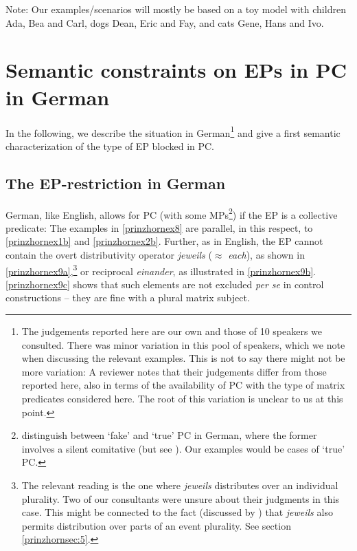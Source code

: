 \documentclass[output=paper,colorlinks,citecolor=brown,
]{langscibook}
\begin{document}
Note: Our examples/scenarios will mostly be based on a toy model with children Ada, Bea and Carl, dogs Dean, Eric and Fay, and cats Gene, Hans and Ivo. 



\section{Semantic constraints on EPs in PC in German}\label{prinzhornsec:2}

In the following, we describe the situation in German\footnote{The judgements reported here are our own and those of 10 speakers we consulted. There was minor variation in this pool of speakers, which we note when discussing the relevant examples. This is not to say there might not be more variation: A reviewer notes that their judgements differ from those reported here, also in terms of the availability of PC with the type of matrix predicates considered here. The root of this variation is unclear to us at this point.} and give a first semantic characterization of the type of EP blocked in PC.

\subsection{The EP-restriction in German}\label{prinzhornsec:2.1}

German, like English, allows for PC (with some MPs\footnote{\cite{Pitteroff:2017} distinguish between `fake' and `true' PC in German, where the former involves a silent comitative (but see \citealt{Landau:2016}). Our examples would be cases of `true' PC.}) if the EP is a collective predicate: The examples in \ref{prinzhornex8} are parallel, in this respect, to \ref{prinzhornex1b} and  \ref{prinzhornex2b}. Further, as in English, the EP cannot contain the overt distributivity operator \textit{jeweils} ($\approx$ \textit{each}), as shown in \ref{prinzhornex9a},\footnote{The relevant reading is the one where \textit{jeweils} distributes over an individual plurality. Two of our consultants were unsure about their judgments in this case. This might be connected to  the fact (discussed by \citealt{Zimmermann:2002}) that \textit{jeweils} also permits distribution over parts of an event plurality.  See section \ref{prinzhornsec:5}.} or reciprocal \textit{einander}, as illustrated in \ref{prinzhornex9b}. \ref{prinzhornex9c} shows that such elements are not excluded \textit{per se} in control constructions -- they are fine with a plural matrix subject.
\end{document}
